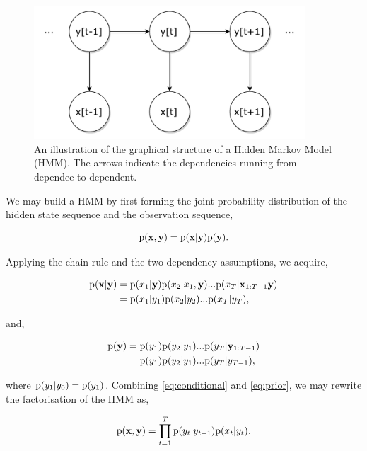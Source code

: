 \begin{figure}[t]
\center
\includegraphics[width=4in]{Figures/HMM.pdf}
\caption{An illustration of the graphical structure of a Hidden Markov Model (HMM). The arrows indicate the dependencies running from dependee to dependent.}
\label{fig:HMM}
\end{figure}

We may build a HMM by first forming the joint probability distribution of the hidden state sequence and the observation sequence,

\begin{equation}
\text{p}(\mathbf{x}, \mathbf{y}) = \text{p}(\mathbf{x} | \mathbf{y}) \text{p}(\mathbf{y}).
\label{eq:joint}
\end{equation}

Applying the chain rule and the two dependency assumptions, we acquire,

\begin{equation}
\begin{aligned}
\text{p}(\mathbf{x} | \mathbf{y}) &= \text{p}(x_1|\mathbf{y}) \text{p}(x_2|x_1, \mathbf{y}) ... \text{p}(x_T|\mathbf{x}_{1:T-1}\mathbf{y}) \\
&= \text{p}(x_1|y_1) \text{p}(x_2|y_2) ... \text{p}(x_T|y_T),
\end{aligned}
\label{eq:conditional}
\end{equation}

and,

\begin{equation}
\begin{aligned}
\text{p}(\mathbf{y}) &= \text{p}(y_1) \text{p}(y_2|y_1) ... \text{p}(y_T|\mathbf{y}_{1:T-1}) \\
&= \text{p}(y_1) \text{p}(y_2|y_1) ... \text{p}(y_T|y_{T-1}),
\end{aligned}
\label{eq:prior}
\end{equation}

where $\text{p}(y_1|y_0) = \text{p}(y_1)$. Combining \ref{eq:conditional} and \ref{eq:prior}, we may rewrite the factorisation of the HMM as,

\begin{equation}
\text{p}(\mathbf{x}, \mathbf{y}) = \prod_{t=1}^T \text{p}(y_t | y_{t-1})\text{p}(x_t | y_t).
\label{eq:factorisedHMM}
\end{equation}

